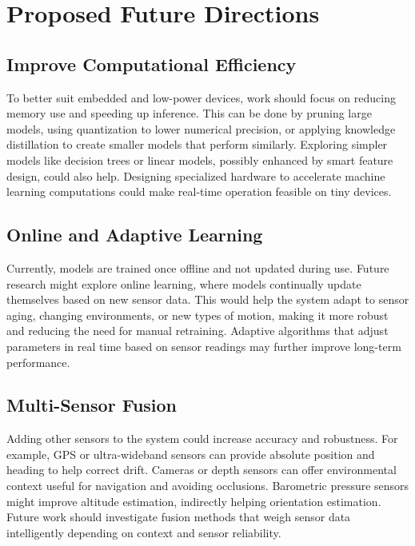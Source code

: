 \documentclass{iutbscthesis}
\begin{document}
\section{Proposed Future Directions}

\subsection{Improve Computational Efficiency}

To better suit embedded and low-power devices, work should focus on reducing memory use and speeding up inference. This can be done by pruning large models, using quantization to lower numerical precision, or applying knowledge distillation to create smaller models that perform similarly. Exploring simpler models like decision trees or linear models, possibly enhanced by smart feature design, could also help. Designing specialized hardware to accelerate machine learning computations could make real-time operation feasible on tiny devices.

\subsection{Online and Adaptive Learning}

Currently, models are trained once offline and not updated during use. Future research might explore online learning, where models continually update themselves based on new sensor data. This would help the system adapt to sensor aging, changing environments, or new types of motion, making it more robust and reducing the need for manual retraining. Adaptive algorithms that adjust parameters in real time based on sensor readings may further improve long-term performance.

\subsection{Multi-Sensor Fusion}

Adding other sensors to the system could increase accuracy and robustness. For example, GPS or ultra-wideband sensors can provide absolute position and heading to help correct drift. Cameras or depth sensors can offer environmental context useful for navigation and avoiding occlusions. Barometric pressure sensors might improve altitude estimation, indirectly helping orientation estimation. Future work should investigate fusion methods that weigh sensor data intelligently depending on context and sensor reliability.
\end{document}
